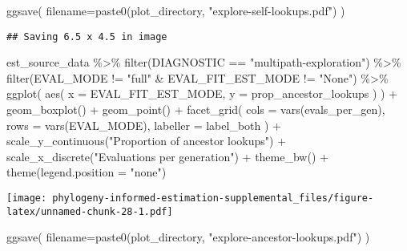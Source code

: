 \documentclass[
]{book}
\newenvironment{Shaded}{\begin{snugshade}}{\end{snugshade}}
\newcommand{\AttributeTok}[1]{\textcolor[rgb]{0.77,0.63,0.00}{#1}}
\newcommand{\FunctionTok}[1]{\textcolor[rgb]{0.00,0.00,0.00}{#1}}
\newcommand{\NormalTok}[1]{#1}
\newcommand{\SpecialCharTok}[1]{\textcolor[rgb]{0.00,0.00,0.00}{#1}}
\newcommand{\StringTok}[1]{\textcolor[rgb]{0.31,0.60,0.02}{#1}}
\begin{document}
\begin{Shaded}
\begin{Highlighting}[]
\FunctionTok{ggsave}\NormalTok{(}
   \AttributeTok{filename=}\FunctionTok{paste0}\NormalTok{(plot\_directory, }\StringTok{"explore{-}self{-}lookups.pdf"}\NormalTok{)}
\NormalTok{)}
\end{Highlighting}
\end{Shaded}

\begin{verbatim}
## Saving 6.5 x 4.5 in image
\end{verbatim}

\begin{Shaded}
\begin{Highlighting}[]
\NormalTok{est\_source\_data }\SpecialCharTok{\%\textgreater{}\%}
  \FunctionTok{filter}\NormalTok{(DIAGNOSTIC }\SpecialCharTok{==} \StringTok{"multipath{-}exploration"}\NormalTok{) }\SpecialCharTok{\%\textgreater{}\%}
  \FunctionTok{filter}\NormalTok{(EVAL\_MODE }\SpecialCharTok{!=} \StringTok{"full"} \SpecialCharTok{\&}\NormalTok{ EVAL\_FIT\_EST\_MODE }\SpecialCharTok{!=} \StringTok{"None"}\NormalTok{) }\SpecialCharTok{\%\textgreater{}\%}
  \FunctionTok{ggplot}\NormalTok{(}
      \FunctionTok{aes}\NormalTok{(}
        \AttributeTok{x =}\NormalTok{ EVAL\_FIT\_EST\_MODE,}
        \AttributeTok{y =}\NormalTok{ prop\_ancestor\_lookups}
\NormalTok{      )}
\NormalTok{    ) }\SpecialCharTok{+}
    \FunctionTok{geom\_boxplot}\NormalTok{() }\SpecialCharTok{+}
    \FunctionTok{geom\_point}\NormalTok{() }\SpecialCharTok{+}
    \FunctionTok{facet\_grid}\NormalTok{(}
      \AttributeTok{cols =} \FunctionTok{vars}\NormalTok{(evals\_per\_gen),}
      \AttributeTok{rows =} \FunctionTok{vars}\NormalTok{(EVAL\_MODE),}
      \AttributeTok{labeller =}\NormalTok{ label\_both}
\NormalTok{    ) }\SpecialCharTok{+}
    \FunctionTok{scale\_y\_continuous}\NormalTok{(}\StringTok{"Proportion of ancestor lookups"}\NormalTok{) }\SpecialCharTok{+}
    \FunctionTok{scale\_x\_discrete}\NormalTok{(}\StringTok{"Evaluations per generation"}\NormalTok{) }\SpecialCharTok{+}
    \FunctionTok{theme\_bw}\NormalTok{() }\SpecialCharTok{+}
    \FunctionTok{theme}\NormalTok{(}\AttributeTok{legend.position =} \StringTok{"none"}\NormalTok{)}
\end{Highlighting}
\end{Shaded}

\texttt{[image: phylogeny-informed-estimation-supplemental\_files/figure-latex/unnamed-chunk-28-1.pdf]}

\begin{Shaded}
\begin{Highlighting}[]
\FunctionTok{ggsave}\NormalTok{(}
   \AttributeTok{filename=}\FunctionTok{paste0}\NormalTok{(plot\_directory, }\StringTok{"explore{-}ancestor{-}lookups.pdf"}\NormalTok{)}
\NormalTok{)}
\end{Highlighting}
\end{Shaded}
\end{document}
